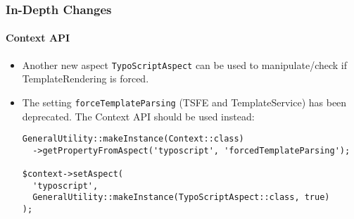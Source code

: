 
\begin{frame}[fragile]
	\frametitle{In-Depth Changes}
	\framesubtitle{Context API}

	\lstset{basicstyle=\tiny\ttfamily}

	\begin{itemize}

		\item Another new aspect \texttt{TypoScriptAspect} can be used to manipulate/check if
			TemplateRendering is forced.

		\item The setting \texttt{forceTemplateParsing} (TSFE and TemplateService) has been deprecated.
			The Context API should be used instead:
\begin{lstlisting}
GeneralUtility::makeInstance(Context::class)
  ->getPropertyFromAspect('typoscript', 'forcedTemplateParsing');

$context->setAspect(
  'typoscript',
  GeneralUtility::makeInstance(TypoScriptAspect::class, true)
);
\end{lstlisting}

	\end{itemize}

\end{frame}

%
%
%
%
%
%
%

